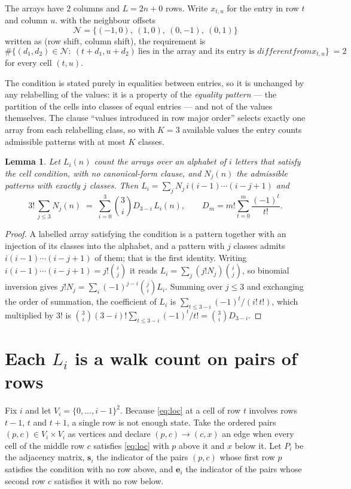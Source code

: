 \documentclass[11pt,a4paper]{article}
\theoremstyle{plain}
\newtheorem{lemma}[theorem]{Lemma}
\theoremstyle{definition}
\begin{document}
The arrays have $2$ columns and $L=2n+0$ rows. Write $x_{t,u}$ for the entry in
row $t$ and column $u$. with the neighbour offsets
\[
\mathcal N=\{(-1,0),\ (1,0),\ (0,-1),\ (0,1)\}
\]
written as (row shift, column shift), the requirement is
\begin{equation}\label{eq:loc}
\#\bigl\{(d_1,d_2)\in\mathcal N:\ (t+d_1,u+d_2)\ \text{lies in the array and its entry is }
different from x_{t,u}\bigr\}\ =2
\end{equation}
for every cell $(t,u)$.

The condition is stated purely in equalities between entries, so it is unchanged by any
relabelling of the values: it is a property of the \emph{equality pattern} --- the partition
of the cells into classes of equal entries --- and not of the values themselves. The clause
``values introduced in row major order'' selects exactly one array from each relabelling
class, so with $K=3$ available values the entry counts admissible patterns with at most $K$
classes.

\begin{lemma}\label{lem:inv}
Let $L_i(n)$ count the arrays over an alphabet of $i$ letters that satisfy the cell
condition, with no canonical-form clause, and $N_j(n)$ the admissible patterns with exactly
$j$ classes. Then $L_i=\sum_j N_j\,i(i-1)\cdots(i-j+1)$ and
\[
3!\,\sum_{j\le 3}N_j(n)\;=\;\sum_{i=0}^{3}\binom{3}{i}D_{3-i}\,L_i(n),
\qquad D_m=m!\sum_{t=0}^{m}\frac{(-1)^t}{t!} .
\]
\end{lemma}

\begin{proof}
A labelled array satisfying the condition is a pattern together with an injection of its
classes into the alphabet, and a pattern with $j$ classes admits $i(i-1)\cdots(i-j+1)$ of
them; that is the first identity. Writing $i(i-1)\cdots(i-j+1)=j!\binom{i}{j}$ it reads
$L_i=\sum_j(j!N_j)\binom{i}{j}$, so binomial inversion gives
$j!N_j=\sum_i(-1)^{j-i}\binom{j}{i}L_i$. Summing over $j\le3$ and exchanging the
order of summation, the coefficient of $L_i$ is
$\sum_{t\le3-i}(-1)^t/(i!\,t!)$, which multiplied by $3!$ is
$\binom{3}{i}(3-i)!\sum_{t\le3-i}(-1)^t/t!=\binom{3}{i}D_{3-i}$.
\end{proof}

\section{Each $L_i$ is a walk count on pairs of rows}

Fix $i$ and let $V_i=\{0,\dots,i-1\}^{2}$. Because \eqref{eq:loc} at a cell of row
$t$ involves rows $t-1$, $t$ and $t+1$, a single row is not enough state. Take the
ordered pairs $(p,c)\in V_i\times V_i$ as vertices and declare $(p,c)\to(c,x)$ an edge when
every cell of the middle row $c$ satisfies \eqref{eq:loc} with $p$ above it and $x$
below it. Let $P_i$ be the adjacency matrix, $\mathbf{s}_i$ the indicator of the pairs
$(p,c)$ whose first row $p$ satisfies the condition with no row above, and
$\mathbf{e}_i$ the indicator of the pairs whose second row $c$ satisfies it with no
row below.
\end{document}
